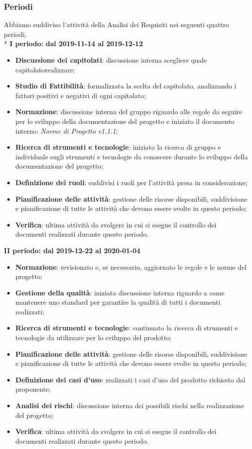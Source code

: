 \subsubsection{Periodi}
Abbiamo suddiviso l'attività della Analisi dei Requisiti nei seguenti quattro periodi. \\*
\textbf{I periodo: dal 2019-11-14 al 2019-12-12}
\begin{itemize}
	\item \textbf{Discussione dei capitolati}: discussione interna scegliere quale capitolato\glosp realizzare;
	\item \textbf{Studio di Fattibilità}: formalizzata la scelta del capitolato\glo , analizzando i fattori positivi e negativi di ogni capitolato\glo ;
	\item \textbf{Normazione}: discussione interna del gruppo riguardo alle regole da seguire per lo sviluppo della documentazione del progetto e iniziato il documento interno: \textit{Norme di Progetto v1.1.1};
	\item \textbf{Ricerca di strumenti e tecnologie}: iniziato la ricerca di gruppo e individuale sugli strumenti e tecnologie da conoscere durante lo sviluppo della documentazione del progetto;
	\item \textbf{Definizione dei ruoli}: suddivisi i ruoli per l'attività presa in considerazione; 
	\item \textbf{Pianificazione delle attività}: gestione delle risorse disponibili, suddivisione e pianificazione di tutte le attività che devono essere svolte in questo periodo;
	\item \textbf{Verifica}: ultima attività da svolgere in cui si esegue il controllo dei documenti realizzati durante questo periodo.
\end{itemize}

\textbf{II periodo: dal 2019-12-22 al 2020-01-04}
\begin{itemize}
	\item \textbf{Normazione}: revisionato e, se necessario, aggiornato le regole e le norme del progetto;
	\item \textbf{Gestione della qualità}: iniziata discussione interna riguardo a come mantenere uno standard per garantire la qualità di tutti i documenti realizzati;
	\item \textbf{Ricerca di strumenti e tecnologie}: continuato la ricerca di strumenti e tecnologie da utilizzare per lo sviluppo del prodotto;
	\item \textbf{Pianificazione delle attività}: gestione delle risorse disponibili, suddivisione e pianificazione di tutte le attività che devono essere svolte in questo periodo;
	\item \textbf{Definizione dei casi d'uso}: realizzati i casi d'uso del prodotto richiesto dal proponente;
	\item \textbf{Analisi dei rischi}: discussione interna dei possibili rischi nella realizzazione del progetto;
	\item \textbf{Verifica}: ultima attività da svolgere in cui si esegue il controllo dei documenti realizzati durante questo periodo.
\end{itemize}

